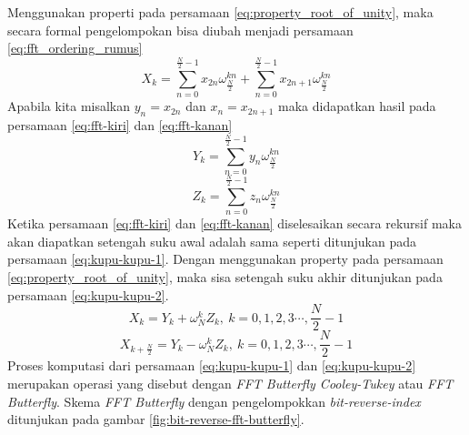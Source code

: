 Menggunakan properti pada persamaan \eqref{eq:property_root_of_unity}, maka secara formal pengelompokan bisa diubah menjadi persamaan \eqref{eq:fft_ordering_rumus}
\begin{equation}
	X_k = \sum_{n=0}^{\frac{N}{2}-1} x_{2n}\omega_{\frac{N}{2}}^{kn} + \sum_{n=0}^{\frac{N}{2}-1} x_{2n+1}\omega_{\frac{N}{2}}^{kn}
	\label{eq:fft_ordering_rumus}
\end{equation}
Apabila kita misalkan $ y_n = x_{2n} $ dan $ x_n = x_{2n+1} $ maka didapatkan hasil pada persamaan \eqref{eq:fft-kiri} dan \eqref{eq:fft-kanan}
\begin{equation}
	Y_k = \sum_{n=0}^{\frac{N}{2}-1} y_{n}\omega_{\frac{N}{2}}^{kn}
	\label{eq:fft-kiri}
\end{equation}
\begin{equation}
	Z_k = \sum_{n=0}^{\frac{N}{2}-1} z_{n}\omega_{\frac{N}{2}}^{kn}
	\label{eq:fft-kanan}
\end{equation}
Ketika persamaan \eqref{eq:fft-kiri} dan \eqref{eq:fft-kanan} diselesaikan secara rekursif maka akan diapatkan setengah suku awal adalah sama seperti ditunjukan pada persamaan \eqref{eq:kupu-kupu-1}. Dengan menggunakan property pada persamaan \eqref{eq:property_root_of_unity}, maka sisa setengah suku akhir ditunjukan pada persamaan \eqref{eq:kupu-kupu-2}.
\begin{equation}
	X_k = Y_k + \omega_{N}^{k} Z_k,\ k = 0,1,2,3 \cdots , \frac{N}{2}-1
	\label{eq:kupu-kupu-1}
\end{equation}
\begin{equation}
	X_{k+\frac{N}{2}} = Y_k - \omega_{N}^{k} Z_k,\ k = 0,1,2,3 \cdots , \frac{N}{2}-1
	\label{eq:kupu-kupu-2}
\end{equation}
Proses komputasi dari persamaan \eqref{eq:kupu-kupu-1} dan \eqref{eq:kupu-kupu-2} merupakan operasi yang disebut dengan \textit{FFT Butterfly Cooley-Tukey} atau \textit{FFT Butterfly}. Skema \textit{FFT Butterfly} dengan pengelompokkan \textit{bit-reverse-index} ditunjukan pada gambar \ref{fig:bit-reverse-fft-butterfly}.

